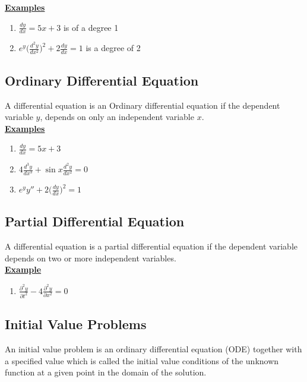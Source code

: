 \documentclass[12pt]{report}
\newcommand{\ubt}[1]{\textbf{\underline{#1}}}
\newcommand{\NI}{\noindent}
\newcommand{\dsp}{\displaystyle}
\newcommand{\dprime}{''}
\begin{document}
	\NI\ubt{Examples}
	\begin{enumerate}
		\item $\dsp \frac{dy}{dx} = 5x + 3$ is of a degree 1
		
		\item $\dsp e^y\Big(\frac{d^2y}{dx^2}\Big)^2 + 2\frac{dy}{dx} = 1$ is a degree of 2 
	\end{enumerate}

	\subsection{Ordinary Differential Equation}
	A differential equation is an Ordinary differential equation if the dependent variable $y$, depends on only an independent variable $x$.\\
	
	\NI\ubt{Examples}
	\begin{enumerate}
		\item $\dsp \frac{dy}{dx} = 5x + 3$
		
		\item $\dsp 4\frac{d^3y}{dx^3} + \sin x \frac{d^2y}{dx^2} =0 $
		
		\item $\dsp e^yy\dprime + 2\Big(\frac{dy}{dx}\Big)^2 = 1$
	\end{enumerate}
	
	\subsection{Partial Differential Equation}
	A differential equation is a partial differential equation if the dependent variable depends on two or more independent variables.\\
	\newpage
	\NI\ubt{Example}
	\begin{enumerate}
		\item $\dsp \frac{\partial^2y}{\partial t^2} - 4\frac{\partial^2y}{\partial x^2} = 0 $
	\end{enumerate}
	
	\subsection{Initial Value Problems}
	An initial value problem is an ordinary differential equation (ODE) together with a specified value which is called the initial value conditions of the unknown function at a given point in the domain of the solution.\\
	
\end{document}
